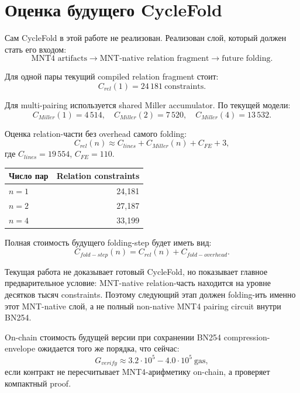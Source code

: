 \documentclass[12pt,a4paper]{article}
\begin{document}
\section{Оценка будущего CycleFold}
Сам CycleFold в этой работе не реализован. Реализован слой, который должен стать его входом:
\[
    \text{MNT4 artifacts} \rightarrow \text{MNT-native relation fragment} \rightarrow \text{future folding}.
\]

Для одной пары текущий compiled relation fragment стоит:
\[
    C_{rel}(1)=24\,181\ \text{constraints}.
\]

Для multi-pairing используется shared Miller accumulator. По текущей модели:
\[
    C_{Miller}(1)=4\,514,\quad
    C_{Miller}(2)=7\,520,\quad
    C_{Miller}(4)=13\,532.
\]

Оценка relation-части без overhead самого folding:
\[
    C_{rel}(n) \approx C_{lines}+C_{Miller}(n)+C_{FE}+3,
\]
где $C_{lines}=19\,554$, $C_{FE}=110$.

\begin{longtable}{L{0.40\textwidth}r}
\toprule
\textbf{Число пар} & \textbf{Relation constraints} \\
\midrule
$n=1$ & 24,181 \\
$n=2$ & 27,187 \\
$n=4$ & 33,199 \\
\bottomrule
\end{longtable}

Полная стоимость будущего folding-step будет иметь вид:
\[
    C_{fold-step}(n)=C_{rel}(n)+C_{fold-overhead}.
\]

Текущая работа не доказывает готовый CycleFold, но показывает главное предварительное условие: MNT-native relation-часть находится на уровне десятков тысяч constraints. Поэтому следующий этап должен folding-ить именно этот MNT-native слой, а не полный non-native MNT4 pairing circuit внутри BN254.

On-chain стоимость будущей версии при сохранении BN254 compression-envelope ожидается того же порядка, что сейчас:
\[
    G_{verify} \approx 3.2\cdot 10^5 - 4.0\cdot 10^5\ \text{gas},
\]
если контракт не пересчитывает MNT4-арифметику on-chain, а проверяет компактный proof.
\end{document}
